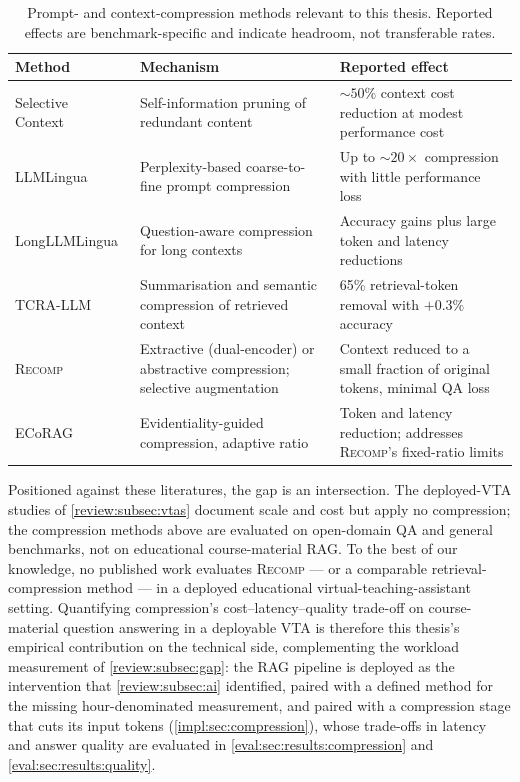 \begin{table}[htb]
  \centering
  \caption{Prompt- and context-compression methods relevant to this thesis.
           Reported effects are benchmark-specific and indicate headroom, not
           transferable rates.}
  \label{review:tab:compression}
  \footnotesize
  \renewcommand{\arraystretch}{1.3}
  \begin{tabular}{L{0.2\textwidth} L{0.33\textwidth} L{0.35\textwidth}}
    \hline
    \textbf{Method} & \textbf{Mechanism} & \textbf{Reported effect} \\
    \hline
    Selective Context~\cite{emnlp23:Li} &
      Self-information pruning of redundant content &
      ${\sim}50\%$ context cost reduction at modest performance cost \\
    LLMLingua~\cite{emnlp23:Jiang} &
      Perplexity-based coarse-to-fine prompt compression &
      Up to ${\sim}20\times$ compression with little performance loss \\
    LongLLMLingua~\cite{acl24:Jiang} &
      Question-aware compression for long contexts &
      Accuracy gains plus large token and latency reductions \\
    TCRA-LLM~\cite{femnlp23:Liu} &
      Summarisation and semantic compression of retrieved context &
      65\% retrieval-token removal with $+0.3\%$ accuracy \\
    \textsc{Recomp}~\cite{iclr24:Xu} &
      Extractive (dual-encoder) or abstractive compression; selective
      augmentation &
      Context reduced to a small fraction of original tokens, minimal QA loss \\
    ECoRAG~\cite{facl25:Jeong} &
      Evidentiality-guided compression, adaptive ratio &
      Token and latency reduction; addresses \textsc{Recomp}'s fixed-ratio
      limits \\
    \hline
  \end{tabular}
\end{table}

Positioned against these literatures, the gap is an intersection. The
deployed-VTA studies of \autoref{review:subsec:vtas} document scale and cost
but apply no compression; the compression methods above are evaluated on
open-domain QA and general benchmarks, not on educational course-material
RAG. To the best of our knowledge, no published work evaluates
\textsc{Recomp} --- or a comparable retrieval-compression method --- in a
deployed educational virtual-teaching-assistant setting. Quantifying
compression's cost--latency--quality trade-off on course-material
question answering in a deployable VTA is therefore this thesis's empirical
contribution on the technical side, complementing the workload measurement of
\autoref{review:subsec:gap}: the RAG pipeline is deployed as the intervention
that \autoref{review:subsec:ai} identified, paired with a defined method for
the missing hour-denominated measurement, and paired with a compression stage
that cuts its input tokens (\autoref{impl:sec:compression}), whose trade-offs in
latency and answer quality are evaluated in
\autoref{eval:sec:results:compression} and \autoref{eval:sec:results:quality}.


